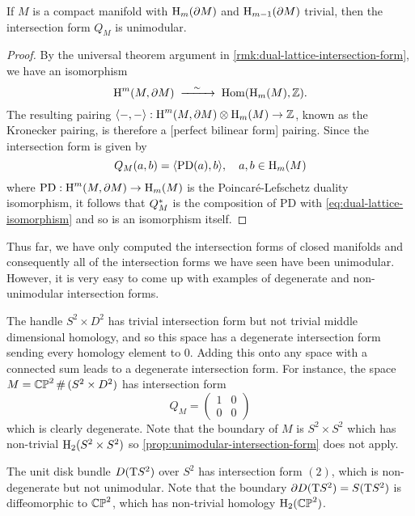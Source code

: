 \begin{proposition}\label{prop:unimodular-intersection-form}
	If $M$ is a compact manifold with $\operatorname{H}_m(\partial M)$ and $\operatorname{H}_{m-1}(\partial M)$ trivial, then the intersection form $Q_M$ is unimodular.
\end{proposition}
\begin{proof}
	By the universal theorem argument in \cref{rmk:dual-lattice-intersection-form}, we have an isomorphism
	\begin{equation}\label{eq:dual-lattice-isomorphism}
		\H^m(M,\partial M) \lkxisom \Hom(\H_m(M), \Z).
	\end{equation}
	The resulting pairing $\langle -, -\rangle : \operatorname{H}^m(M,\partial M)\otimes \operatorname{H}_m(M) \to \mathbb{Z}$, known as the Kronecker pairing, is therefore a [perfect bilinear form] pairing. Since the intersection form is given by
	\[
		Q_M(a,b) = \langle \mathrm{PD}(a), b\rangle,\quad a,b\in \operatorname{H}_m(M)
	\]
	where $\mathrm{PD} : \operatorname{H}^{m}(M,\partial M) \to \operatorname{H}_m(M)$ is the Poincar\'e-Lefschetz duality isomorphism, it follows that $Q_M^*$ is the composition of $\mathrm{PD}$ with \cref{eq:dual-lattice-isomorphism} and so is an isomorphism itself.
\end{proof}

Thus far, we have only computed the intersection forms of closed manifolds and consequently all of the intersection forms we have seen have been unimodular. However, it is very easy to come up with examples of degenerate and non-unimodular intersection forms.

\begin{example}
	The handle $S^2\times D^2$ has trivial intersection form but not trivial middle dimensional homology, and so this space has a degenerate intersection form sending every homology element to $0$. Adding this onto any space with a connected sum leads to a degenerate intersection form.
	For instance, the space $M=\CP^2\+(S^2\times D^2)$ has intersection form
	\[
		Q_M = \begin{pmatrix}
			1 & 0 \\ 0 & 0
		\end{pmatrix}
	\]
	which is clearly degenerate. Note that the boundary of $M$ is $S^2\times S^2$ which has non-trivial $\operatorname{H}_2(S^2\times S^2)$ so \cref{prop:unimodular-intersection-form} does not apply.
\end{example}

\begin{example}
	The unit disk bundle $D(\mathrm{T} S^2)$ over $S^2$ has intersection form $(2)$, which is non-degenerate but not unimodular. Note that the boundary $\partial D(\mathrm{T} S^2)= S(\mathrm{T} S^2)$ is diffeomorphic to $\mathbb{CP}^2$, which has non-trivial homology $\operatorname{H}_2(\mathbb{CP}^2)$.
\end{example}

